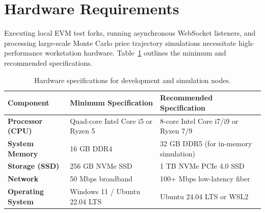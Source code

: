 \section{Hardware Requirements}
Executing local EVM test forks, running asynchronous WebSocket listeners, and processing large-scale Monte Carlo price trajectory simulations necessitate high-performance workstation hardware. Table~\ref{tab:hardware_requirements} outlines the minimum and recommended specifications.

\begin{table}[htbp]
\centering
\small
\caption{Hardware specifications for development and simulation nodes.}
\label{tab:hardware_requirements}
\begin{tabular}{p{3.2cm}|p{5.2cm}|p{5.2cm}}
\hline
\textbf{Component} & \textbf{Minimum Specification} & \textbf{Recommended Specification} \\
\hline
\textbf{Processor (CPU)} & Quad-core Intel Core i5 or Ryzen 5 & 8-core Intel Core i7/i9 or Ryzen 7/9 \\
\textbf{System Memory} & 16 GB DDR4 & 32 GB DDR5 (for in-memory simulation) \\
\textbf{Storage (SSD)} & 256 GB NVMe SSD & 1 TB NVMe PCIe 4.0 SSD \\
\textbf{Network} & 50 Mbps broadband & 100+ Mbps low-latency fiber \\
\textbf{Operating System} & Windows 11 / Ubuntu 22.04 LTS & Ubuntu 24.04 LTS or WSL2 \\
\hline
\end{tabular}
\end{table}
